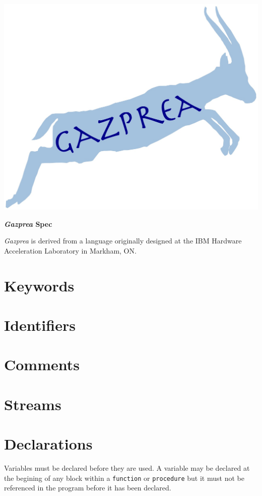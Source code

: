 \documentclass{article}
\begin{document}
\includegraphics[width=.5\textwidth]{static/GazpreaLogo.png}

\ifpdf
  \LARGE
  \textbf{\textit{Gazprea} Spec}
  \normalsize
  \hspace{.7in}
\fi

\textit{Gazprea} is derived from a language originally designed at the IBM Hardware Acceleration
Laboratory in Markham, ON.

\ifpdf
  \tableofcontents
\fi

\section{Keywords}
\label{sec:keywords}


\section{Identifiers}
\label{sec:identifiers}


\section{Comments}
\label{sec:comments}


\section{Streams}
\label{sec:streams}


\section{Declarations}
\label{sec:declaration}

  Variables must be declared before they are used. A variable may be declared at the begining of
  any block within a \texttt{function} or \texttt{procedure}  but it must not be referenced in the
  program before it has been declared.
\end{document}
